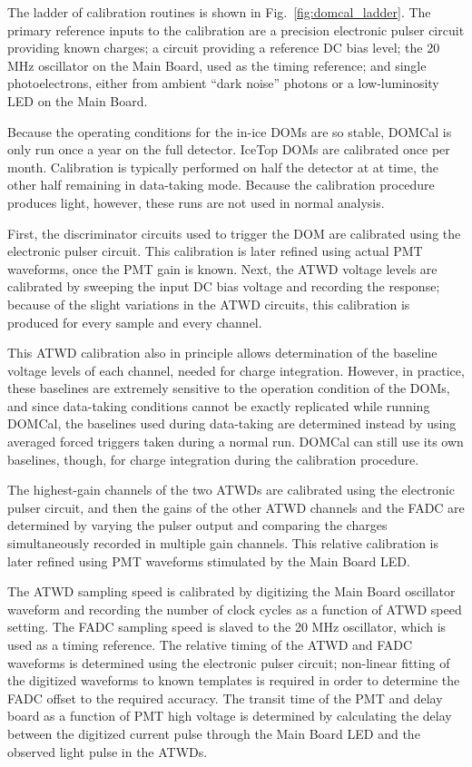 The ladder of calibration routines is shown in Fig.~\ref{fig:domcal_ladder}. The
primary reference inputs to the calibration are a precision electronic
pulser circuit providing known charges; a circuit providing a reference DC
bias level; the 20 MHz oscillator on the Main
Board, used as the timing reference; and single photoelectrons, either from
ambient ``dark noise'' photons or a low-luminosity LED on the Main Board.

Because the operating conditions for
the in-ice DOMs are so stable, DOMCal is only run once a year on the full
detector. IceTop DOMs are calibrated once per month.  Calibration is
typically performed on half the detector at at time, the other half
remaining in data-taking mode.  Because the calibration procedure produces
light, however, these runs are not used in normal analysis.


First, the discriminator circuits used to trigger the DOM are calibrated
using the electronic pulser circuit.  This calibration is later refined using actual
PMT waveforms, once the PMT gain is known.  Next, the ATWD voltage levels
are calibrated by sweeping the input DC bias voltage and recording the
response; because of the slight variations in the ATWD circuits, this
calibration is produced for every sample and every channel.

This ATWD calibration also in principle allows determination of the baseline
voltage levels of each channel, needed for charge integration.  However, in
practice, these baselines are extremely sensitive to the operation
condition of the DOMs, and since data-taking conditions cannot be exactly
replicated while running DOMCal, the baselines used during data-taking are
determined instead by using averaged forced triggers taken during a normal
run.  DOMCal can still use its own baselines, though, for charge integration
during the calibration procedure.

The highest-gain channels of the two ATWDs are calibrated using the electronic
pulser circuit, and then the gains of the other ATWD channels and the FADC
are determined by varying the pulser output and comparing the charges
simultaneously recorded in multiple gain channels.  This relative
calibration is later refined using PMT waveforms stimulated by the Main
Board LED.

The ATWD sampling speed is calibrated by digitizing the Main Board oscillator
waveform and recording the number of clock cycles as a function of ATWD
speed setting.  The FADC sampling speed is slaved to the 20 MHz
oscillator, which is used as a timing reference.  The relative timing of
the ATWD and FADC waveforms is determined using the electronic pulser circuit;
non-linear fitting of the digitized waveforms to known templates is
required in order to determine the FADC offset to the required accuracy.
The transit time of the PMT and delay board as a function of PMT high
voltage is determined by calculating the delay between the digitized
current pulse through the Main Board LED and the observed light pulse in
the ATWDs.   

